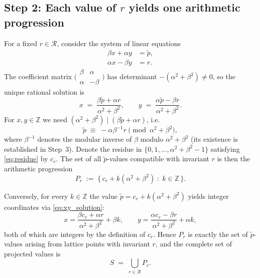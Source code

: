 \documentclass[11pt]{article}
\theoremstyle{plain}
\theoremstyle{definition}
\theoremstyle{remark}
\begin{document}
\subsection{Step 2: Each value of $r$ yields one arithmetic progression}
\label{subsec:step2}

For a fixed $r \in \mathcal{R}$, consider the system of linear equations
\begin{align}
    \beta x + \alpha y &= \tilde{p}, \label{eq:sys1}\\
    \alpha x - \beta y &= r. \label{eq:sys2}
\end{align}
The coefficient matrix
$\bigl(\begin{smallmatrix}\beta & \alpha \\ \alpha & -\beta\end{smallmatrix}\bigr)$
has determinant $-(\alpha^2 + \beta^2) \ne 0$, so the unique rational solution is
\begin{equation}\label{eq:xy_solution}
    x \;=\; \frac{\beta \tilde{p} + \alpha r}{\alpha^2+\beta^2}, \qquad
    y \;=\; \frac{\alpha \tilde{p} - \beta r}{\alpha^2+\beta^2}.
\end{equation}
For $x, y \in \mathbb{Z}$ we need
$(\alpha^2+\beta^2) \mid (\beta\tilde{p} + \alpha r)$, i.e.\
\begin{equation}\label{eq:residue}
    \tilde{p} \;\equiv\; -\alpha\beta^{-1} r \pmod{\alpha^2+\beta^2},
\end{equation}
where $\beta^{-1}$ denotes the modular inverse of $\beta$ modulo
$\alpha^2+\beta^2$ (its existence is established in Step~3).
Denote the residue in $\{0, 1, \ldots, \alpha^2+\beta^2-1\}$ satisfying
\eqref{eq:residue} by $c_r$.  The set of all $\tilde{p}$-values compatible
with invariant $r$ is then the arithmetic progression
\begin{equation}\label{eq:Pr}
    P_r \;:=\; \bigl\{\,c_r + k(\alpha^2+\beta^2) \;:\; k \in \mathbb{Z}\,\bigr\}.
\end{equation}

Conversely, for every $k \in \mathbb{Z}$ the value
$\tilde{p} = c_r + k(\alpha^2+\beta^2)$ yields integer coordinates via
\eqref{eq:xy_solution}:
\[
    x = \frac{\beta c_r + \alpha r}{\alpha^2+\beta^2} + \beta k, \qquad
    y = \frac{\alpha c_r - \beta r}{\alpha^2+\beta^2} + \alpha k,
\]
both of which are integers by the definition of $c_r$.  Hence $P_r$ is
exactly the set of $\tilde{p}$-values arising from lattice points with
invariant $r$, and the complete set of projected values is
\begin{equation}\label{eq:union}
    S \;=\; \bigcup_{r \in \mathcal{R}} P_r.
\end{equation}
\end{document}
